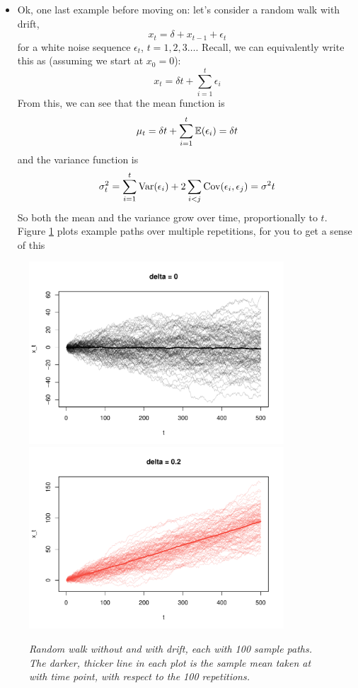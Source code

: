 \documentclass{article}
\begin{document}
\begin{itemize}
\item Ok, one last example before moving on: let's consider a random walk with
  drift,
  \[
  x_t = \delta + x_{t-1} + \epsilon_t
  \]
  for a white noise sequence $\epsilon_t$, $t = 1,2,3\dots$.  Recall, we can
  equivalently write this as (assuming we start at $x_0 = 0$):
  \[
  x_t = \delta t + \sum_{i=1}^t \epsilon_i 
  \] 
  From this, we can see that the mean function is 
  \[
  \mu_t = \delta t + \sum_{i=1}^t \mathbb{E}(\epsilon_i) = \delta t
  \]
  and the variance function is 
  \[
  \sigma^2_t = \sum_{i=1}^t \operatorname{Var}(\epsilon_i) + 2 \sum_{i<j} \operatorname{Cov}(\epsilon_i,
  \epsilon_j) = \sigma^2 t
  \]
  So both the mean and the variance grow over time, proportionally to $t$. 
  Figure \ref{fig:rw} plots example paths over multiple repetitions, for you to
  get a sense of this
\end{itemize}

\begin{figure}[p]
\centering
\includegraphics[width=0.85\textwidth]{fig/rw-1.pdf}
\includegraphics[width=0.85\textwidth]{fig/rw-2.pdf}
\caption{\it Random walk without and with drift, each with 100 sample paths. The
  darker, thicker line in each plot is the sample mean taken at with time point,
  with respect to the 100 repetitions.}
\label{fig:rw}
\end{figure}
\end{document}
